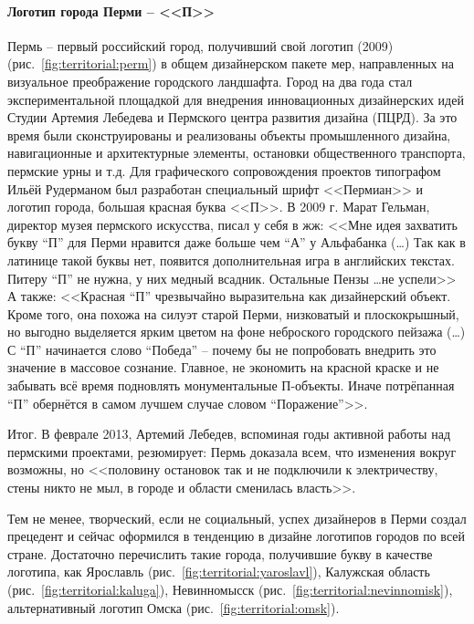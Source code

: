 \paragraph{Логотип города Перми -- <<П>>}

Пермь -- первый российский город, получивший свой логотип (2009) (рис.~\ref{fig:territorial:perm}) в
общем дизайнерском пакете мер, направленных на  визуальное преображение городского ландшафта.  Город
на два года стал экспериментальной площадкой для внедрения инновационных дизайнерских идей Студии
Артемия Лебедева и Пермского центра развития дизайна (ПЦРД). За это время были сконструированы и
реализованы объекты промышленного дизайна, навигационные и  архитектурные элементы, остановки
общественного транспорта, пермские урны и т.д. Для графического сопровождения проектов типографом
Ильёй Рудерманом был разработан  специальный шрифт <<Пермиан>> и логотип города, большая красная
буква <<П>>.  В 2009 г. Марат Гельман, директор музея пермского искусства, писал у себя в жж: <<Мне
идея захватить букву ``П'' для Перми нравится даже больше чем ``А'' у Альфабанка (\ldots) Так как в
латинице такой буквы нет, появится дополнительная игра в английских текстах. Питеру ``П'' не нужна,
у них медный всадник. Остальные Пензы \ldots не успели>> \autocite{link:gelman} А также: <<Красная
``П'' чрезвычайно выразительна как дизайнерский объект. Кроме того, она похожа на силуэт старой Перми,
низковатый и плоскокрышный, но выгодно выделяется ярким цветом на фоне неброского городского пейзажа
(\ldots) С ``П'' начинается слово ``Победа'' -- почему бы не попробовать внедрить это значение в массовое
сознание. Главное, не экономить на красной краске и не забывать всё время подновлять монументальные
П-объекты. Иначе потрёпанная ``П'' обернётся в самом лучшем случае словом
``Поражение''>>. \autocite[][361]{book:gordon}

Итог. В феврале 2013, Артемий Лебедев, вспоминая годы активной работы над пермскими проектами,
резюмирует: Пермь доказала всем, что изменения вокруг возможны, но <<половину остановок так и не
подключили к электричеству, стены никто не мыл, в городе и области сменилась власть>>. \autocite{link:lebedev}

Тем не менее, творческий, если не социальный, успех дизайнеров в Перми создал прецедент и сейчас
оформился в тенденцию в дизайне логотипов городов по всей стране.  Достаточно перечислить такие
города, получившие букву в качестве логотипа, как Ярославль (рис.~\ref{fig:territorial:yaroslavl}),
Калужская область (рис.~\ref{fig:territorial:kaluga}), Невинномысск
(рис.~\ref{fig:territorial:nevinnomisk}), альтернативный логотип Омска (рис.~\ref{fig:territorial:omsk}).

